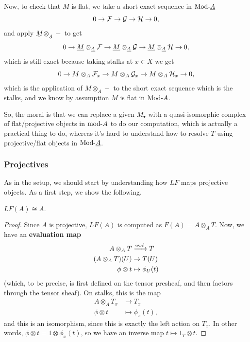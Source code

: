 \documentclass[12pt]{article}
\begin{document}
Now, to check that $\underline{M}$ is flat, we take a short exact sequence in $\mathrm{Mod}\text{-} \underline{A}$
\[0 \to \mathcal{F} \to \mathcal{G} \to \mathcal{H} \to 0,\]
and apply $\underline{M} \otimes_{\underline{A}} -$ to get
\[0 \to \underline{M} \otimes_{\underline{A}} \mathcal{F} \to \underline{M} \otimes_{\underline{A}} \mathcal{G} \to \underline{M} \otimes_{\underline{A}} \mathcal{H} \to 0,\]
which is still exact because taking stalks at $x\in X$ we get
\[0 \to M \otimes_A \mathcal{F}_x \to M\otimes_A \mathcal{G}_x \to M \otimes_A \mathcal{H}_x \to 0,\]
which is the application of $M\otimes_A -$ to the short exact sequence which is the stalks, and we know by assumption $M$ is flat in $\mathrm{Mod}\text{-} A$.

So, the moral is that we can replace a given $M_\bullet$ with a quasi-isomorphic complex of flat/projective objects in $\mathrm{mod}\text{-} A$ to do our computation, which is actually a practical thing to do, whereas it's hard to understand how to resolve $T$ using projective/flat objects in $\mathrm{Mod}\text{-} \underline{A}$.


\subsubsection{Projectives}

As in the setup, we should start by understanding how $LF$ maps projective objects. As a first step, we show the following.
\begin{prop}
    $LF(A) \cong A$.
\end{prop}
\begin{proof}
    Since $A$ is projective, $LF(A)$ is computed as $F(A) = A\otimes_A T$. Now, we have an \textbf{evaluation map}
    \begin{align*}
        A\otimes_A T &\xrightarrow{\eval} T\\
        (A\otimes_A T)(U) &\rightarrow T(U)\\
        \phi \otimes t &\mapsto \phi_U(t)
    \end{align*}
    (which, to be precise, is first defined on the tensor presheaf, and then factors through the tensor sheaf). On stalks, this is the map
    \begin{align*}
        A\otimes_A T_x &\longrightarrow T_x\\
        \phi\otimes t &\longmapsto \phi_x(t),
    \end{align*}
    and this is an isomorphism, since this is exactly the left action on $T_x$. In other words, $\phi\otimes t = 1\otimes \phi_x(t)$, so we have an inverse map $t\longmapsto 1_T \otimes t$.
\end{proof}
\end{document}
